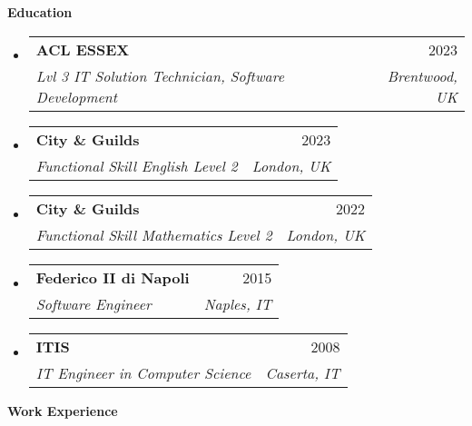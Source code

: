 \documentclass[letterpaper,12pt]{article}[leftmargin=*]
\makeatletter
\def\phoneicon{{\FA\symbol{"F095}}}
\def \fullname {\begin{tabular}{@{}l@{}}
  {\fontsize{35}{45}\selectfont\textbf{\color{primary}Daniele}} \\[-16pt]
  {\fontsize{35}{45}\selectfont\color{primary}Della Cioppa}
\end{tabular}}
\def \subtitle {}
\def \linkedinicon {\faLinkedin}
\def \linkedinlink {https://www.linkedin.com/in/daniele-della-cioppa-41b062115/}
\def \linkedintext {/daniele-della-cioppa}
\def \phoneicon {\faPhone}
\def \phonetext {+44 7491954954}
\def \emailicon {\faEnvelope}
\def \emaillink {mailto:daniele.dellacioppa@gmail.com}
\def \emailtext {daniele.dellacioppa@gmail.com}
\def \githubicon {\faGithub}
\def \githublink {https://github.com/danieledellacioppa}
\def \githubtext {/danieledellacioppa}
\def \websiteicon {\faGlobe}
\def \websitelink {https://danieledellacioppa.github.io/}
\def \websitetext {/portfolio}
\def \headertype {\doublecol}
\def \entryspacing {-0pt}
\def \linkedin {\linkedinicon \hspace{3pt}\href{\linkedinlink}{\linkedintext}}
\def \phone {\phoneicon \hspace{3pt}{ \phonetext}}
\def \email {\emailicon \hspace{3pt}\href{\emaillink}{\emailtext}}
\def \github {\githubicon \hspace{3pt}\href{\githublink}{\githubtext}}
\def \website {\websiteicon \hspace{3pt}\href{\websitelink}{\websitetext}}
\renewcommand{\section}[2]{\vspace{5pt}
  \colorbox{secondary}{\color{white}\raggedbottom\normalsize\textbf{{#1}{\hspace{7pt}#2}}}
}
\newcommand{\resumeEntryStart}{\begin{itemize}[leftmargin=2.5mm]}
\newcommand{\resumeEntryEnd}{\end{itemize}\vspace{\entryspacing}}
\newcommand{\resumeEntryTSDL}[4]{
  \vspace{-1pt}\item[]
    \begin{tabularx}{0.97\textwidth}{X@{\hspace{60pt}}r}
      \textbf{\color{primary}#1} & {\firabook\color{accent}\small#2} \\
      \textit{\color{accent}\small#3} & \textit{\color{accent}\small#4} \\
    \end{tabularx}\vspace{-6pt}
}
\newcommand{\doublecol}[6]{
  \begin{tabularx}{\textwidth}{Xr}
    {
      \begin{tabular}[c]{l}
        \fontsize{35}{45}\selectfont{\color{primary}{{\textbf{\fullname}}}} \\
        {\textit{\subtitle}} 
      \end{tabular}
    } & {
      \begin{tabular}[c]{l@{\hspace{1.5em}}l}
        {\small#4} & {\small#1} \\
        {\small#5} & {\small#2} \\
        {\small#6} & {\small#3}
      \end{tabular}
    }
  \end{tabularx}
}
\makeatother
\begin{document}


\headertype{\linkedin}{\github}{\website}{\phone}{\email}{}
\vspace{-10pt}

\section{\faGraduationCap}{Education}

  \resumeEntryStart
    \resumeEntryTSDL
      {ACL ESSEX}{2023}
      {Lvl 3 IT Solution Technician, Software Development}{Brentwood, UK}
    \resumeEntryTSDL
      {City \& Guilds}{2023}
      {Functional Skill English Level 2}{London, UK}
    \resumeEntryTSDL
      {City \& Guilds}{2022}
      {Functional Skill Mathematics Level 2}{London, UK}
    \resumeEntryTSDL
      {Federico II di Napoli}{2015}
      {Software Engineer}{Naples, IT}
    \resumeEntryTSDL
      {ITIS}{2008}
      {IT Engineer in Computer Science}{Caserta, IT}
  \resumeEntryEnd

\section{\faCode}{Work Experience}
\end{document}
